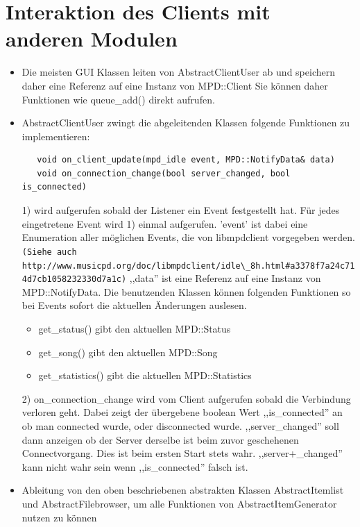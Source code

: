 \section{Interaktion des Clients mit anderen Modulen}
\begin{itemize}
\item Die meisten GUI Klassen leiten von AbstractClientUser ab und speichern daher eine Referenz auf eine Instanz von MPD::Client
        Sie können daher Funktionen wie queue\_add() direkt aufrufen.
\item AbstractClientUser zwingt die abgeleitenden Klassen folgende Funktionen zu implementieren: 
\begin{verbatim} 
   void on_client_update(mpd_idle event, MPD::NotifyData& data)
   void on_connection_change(bool server_changed, bool is_connected)
\end{verbatim}

1) wird aufgerufen sobald der Listener ein Event festgestellt hat. Für jedes eingetretene Event wird 1)
   einmal aufgerufen. 'event' ist dabei eine Enumeration aller möglichen Events, die von libmpdclient 
   vorgegeben werden. \verb+(Siehe auch http://www.musicpd.org/doc/libmpdclient/idle\_8h.html#a3378f7a24c714d7cb1058232330d7a1c)+
   ,,data'' ist eine Referenz auf eine Instanz von MPD::NotifyData. Die benutzenden Klassen können folgenden Funktionen so
   bei Events sofort die aktuellen Änderungen auslesen. 
   \begin{itemize} 
     \item get\_status() gibt den aktuellen MPD::Status
     \item get\_song() gibt den aktuellen MPD::Song
     \item get\_statistics() gibt die aktuellen MPD::Statistics
   \end{itemize} 

2) on\_connection\_change wird vom Client aufgerufen sobald die Verbindung verloren geht.
   Dabei zeigt der übergebene boolean Wert ,,is\_connected'' an ob man connected wurde, oder disconnected wurde.
   ,,server\_changed'' soll dann anzeigen ob der Server derselbe ist beim zuvor geschehenen Connectvorgang.
   Dies ist beim ersten Start stets wahr. ,,server+\_changed'' kann nicht wahr sein wenn ,,is\_connected'' falsch ist.
\item Ableitung von den oben beschriebenen abstrakten Klassen AbstractItemlist und AbstractFilebrowser, um alle Funktionen von AbstractItemGenerator nutzen zu können  
\end{itemize}




